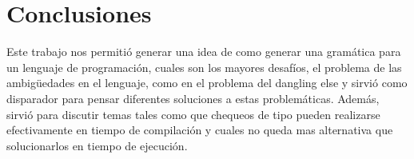\section{Conclusiones}
Este trabajo nos permitió generar una idea de como generar una gramática para un lenguaje de programación, cuales son los mayores desafíos, el problema de las ambigüedades en el lenguaje, como en el problema del dangling else y sirvió como disparador para pensar diferentes soluciones a estas problemáticas. Además, sirvió para discutir temas tales como que chequeos de tipo pueden realizarse efectivamente en tiempo de compilación y cuales no queda mas alternativa que solucionarlos en tiempo de ejecución.